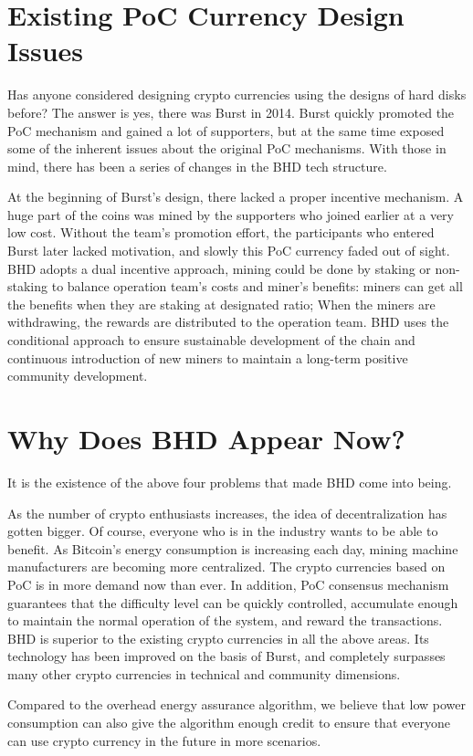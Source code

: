 \section{Existing PoC Currency Design Issues}
\begin{flushleft}
    Has anyone considered designing crypto currencies using the designs of hard disks before? The answer is yes, there was Burst in 2014. Burst quickly promoted the PoC mechanism and gained a lot of supporters, but at the same time exposed some of the inherent issues about the original PoC mechanisms. With those in mind, there has been a series of changes in the BHD tech structure.
\end{flushleft}
\begin{flushleft}
    At the beginning of Burst's design, there lacked a proper incentive mechanism. A huge part of the coins was mined by the supporters who joined earlier at a very low cost. Without the team's promotion effort, the participants who entered Burst later lacked motivation, and slowly this PoC currency faded out of sight. BHD adopts a dual incentive approach, mining could be done by staking or non-staking to balance operation team's costs and miner's benefits: miners can get all the benefits when they are staking at designated ratio; When the miners are withdrawing, the rewards are distributed to the operation team. BHD uses the conditional approach to ensure sustainable development of the chain and continuous introduction of new miners to maintain a long-term positive community development.
\end{flushleft}
\section{Why Does BHD Appear Now?}
\begin{flushleft}
    It is the existence of the above four problems that made BHD come into being.
\end{flushleft}
\begin{flushleft}
    As the number of crypto enthusiasts increases, the idea of decentralization has gotten bigger. Of course, everyone who is in the industry wants to be able to benefit. As Bitcoin's energy consumption is increasing each day, mining machine manufacturers are becoming more centralized. The crypto currencies based on PoC is in more demand now than ever. In addition, PoC consensus mechanism guarantees that the difficulty level can be quickly controlled, accumulate enough to maintain the normal operation of the system, and reward the transactions. BHD is superior to the existing crypto currencies in all the above areas. Its technology has been improved on the basis of Burst, and completely surpasses many other crypto currencies in technical and community dimensions.
\end{flushleft}
\begin{flushleft}
    Compared to the overhead energy assurance algorithm, we believe that low power consumption can also give the algorithm enough credit to ensure that everyone can use crypto currency in the future in more scenarios.
\end{flushleft}
